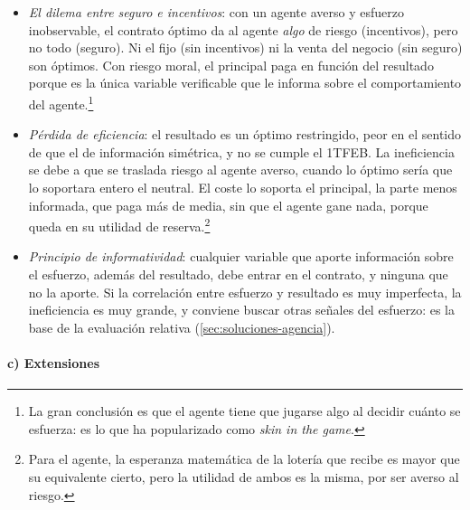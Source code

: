 \documentclass[11pt]{article}
\begin{document}
\begin{itemize}
\item \emph{El dilema entre seguro e incentivos}: con un agente averso y esfuerzo inobservable, el contrato óptimo da al agente \emph{algo} de riesgo (incentivos), pero no todo (seguro). Ni el fijo (sin incentivos) ni la venta del negocio (sin seguro) son óptimos. Con riesgo moral, el principal paga en función del resultado porque es la única variable verificable que le informa sobre el comportamiento del agente.\footnote{La gran conclusión es que el agente tiene que jugarse algo al decidir cuánto se esfuerza: es lo que \textcite{Taleb2018Skin} ha popularizado como \emph{skin in the game}.}
\item \emph{Pérdida de eficiencia}: el resultado es un óptimo restringido, peor en el sentido de  que el de información simétrica, y no se cumple el 1TFEB. La ineficiencia se debe a que se traslada riesgo al agente averso, cuando lo óptimo sería que lo soportara entero el neutral. El coste lo soporta el principal, la parte menos informada, que paga más de media, sin que el agente gane nada, porque queda en su utilidad de reserva.\footnote{Para el agente, la esperanza matemática de la lotería que recibe es mayor que su equivalente cierto, pero la utilidad de ambos es la misma, por ser averso al riesgo.}
\item \emph{Principio de informatividad}\nocite{Holmstrom1979Moral}: cualquier variable que aporte información sobre el esfuerzo, además del resultado, debe entrar en el contrato, y ninguna que no la aporte. Si la correlación entre esfuerzo y resultado es muy imperfecta, la ineficiencia es muy grande, y conviene buscar otras señales del esfuerzo: es la base de la evaluación relativa (\ref{sec:soluciones-agencia}).
\end{itemize}

\paragraph{c) Extensiones}
\end{document}

